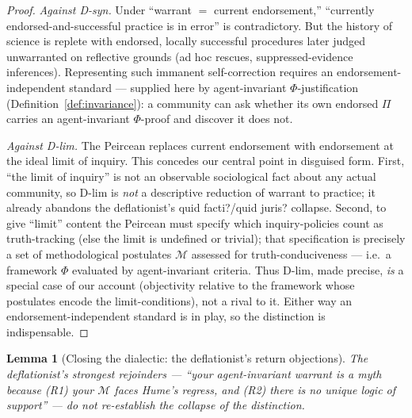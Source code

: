 \documentclass{amsart}
\theoremstyle{definition}
\theoremstyle{plain}
\newtheorem{lemma}{Lemma}
\theoremstyle{remark}
\begin{document}
\begin{proof}
\emph{Against D-syn.} Under ``warrant $=$ current endorsement,'' ``currently
endorsed-and-successful practice is in error'' is contradictory. But the
history of science is replete with endorsed, locally successful procedures
later judged unwarranted on reflective grounds (ad hoc rescues,
suppressed-evidence inferences). Representing such immanent self-correction
requires an endorsement-independent standard --- supplied here by
agent-invariant $\Phi$-justification (Definition~\ref{def:invariance}): a
community can ask whether its own endorsed $\Pi$ carries an agent-invariant
$\Phi$-proof and discover it does not.

\emph{Against D-lim.} The Peircean replaces current endorsement with
endorsement at the ideal limit of inquiry. This concedes our central point in
disguised form. First, ``the limit of inquiry'' is not an observable
sociological fact about any actual community, so D-lim is \emph{not} a
descriptive reduction of warrant to practice; it already abandons the
deflationist's quid facti?/quid juris? collapse. Second, to give ``limit''
content the Peircean must specify which inquiry-policies count as truth-tracking
(else the limit is undefined or trivial); that specification is precisely a set
of methodological postulates $\mathcal{M}$ assessed for truth-conduciveness ---
i.e.\ a framework $\Phi$ evaluated by agent-invariant criteria. Thus D-lim,
made precise, \emph{is} a special case of our account (objectivity relative to
the framework whose postulates encode the limit-conditions), not a rival to it.
Either way an endorsement-independent standard is in play, so the distinction
is indispensable.
\end{proof}

\begin{lemma}[Closing the dialectic: the deflationist's return objections]
\label{lem:return}
The deflationist's strongest rejoinders --- ``your agent-invariant warrant is a
myth because (R1) your $\mathcal{M}$ faces Hume's regress, and (R2) there is no
unique logic of support'' --- do not re-establish the collapse of the
distinction.
\end{lemma}
\end{document}
